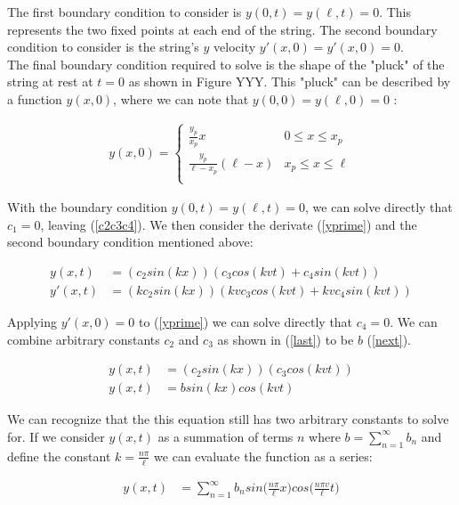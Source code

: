 \documentclass[%
 reprint,
 amsmath,amssymb,
 aps,
]{revtex4-1}
\begin{document}
The first boundary condition to consider is $y(0,t)=y(\ell,t)=0$. This represents the two fixed points at each end of the string. The second boundary condition to consider is the string's $y$ velocity $y'(x,0)=y'(x,0)=0.$\\

The final boundary condition required to solve is the shape of the "pluck" of the string at rest at $t=0$ as shown in Figure YYY. This "pluck" can be described by a function $y(x,0)$, where we can note that $y(0,0)=y(\ell,0)=0$ :

\begin{align} \label{y0}
y(x,0) =  
   \begin{cases} 
      \frac{y_p}{x_p}x & 0 \leq x\leq x_p \\
      \frac{y_p}{\ell-x_p}(\ell-x) & x_p \leq x\leq \ell \\
   \end{cases}
\end{align}

With the boundary condition $y(0,t)=y(\ell,t)=0$, we can solve directly that $c_1 = 0$, leaving (\ref{c2c3c4}). We then consider the derivate (\ref{yprime})  and the second boundary condition mentioned above:

\begin{align}
y(x,t) &=(c_2sin(kx))(c_3 cos(kvt) + c_4sin(kvt)) \label{c2c3c4}\\
y'(x,t) &= (kc_2sin(kx))(kvc_3cos(kvt)+kvc_4sin(kvt)) \label{yprime}
\end{align}

Applying $y'(x,0)=0$ to (\ref{yprime}) we can solve directly that $c_4 = 0$. We can combine arbitrary constants $c_2$ and $c_3$ as shown in (\ref{last}) to be $b$ (\ref{next}).

\begin{align}
y(x,t) &=(c_2sin(kx))(c_3 cos(kvt)) \label{last}\\
y(x,t) &= b sin(kx)cos(kvt) \label{next}
\end{align}

We can recognize that the this equation still has two arbitrary constants to solve for. If we consider $y(x,t)$ as a summation of terms $n$ where $b = \sum_{n=1}^{\infty} b_n$ and define the constant $k = \frac{n\pi}{\ell}$ we can evaluate the function as a series:

\begin{align}
y(x,t) &= \sum_{n=1}^{\infty} b_n sin\Big(\frac{n\pi}{\ell}x\Big)cos\Big(\frac{n\pi v}{\ell}t\Big) \label{yxt}
\end{align}
\end{document}
